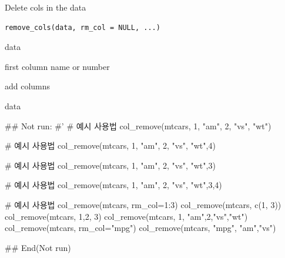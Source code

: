 \documentclass[a4paper]{book}
\begin{document}
%
\begin{Description}
Delete cols in the data
\end{Description}
%
\begin{Usage}
\begin{verbatim}
remove_cols(data, rm_col = NULL, ...)
\end{verbatim}
\end{Usage}
%
\begin{Arguments}
\begin{ldescription}
\item[\code{data}] data

\item[\code{rm\_col}] first column name or number

\item[\code{...}] add columns
\end{ldescription}
\end{Arguments}
%
\begin{Value}
data
\end{Value}
%
\begin{Examples}
\begin{ExampleCode}
\#\# Not run: 
#'
# 예시 사용법
col_remove(mtcars, 1, "am", 2, "vs", "wt")

# 예시 사용법
col_remove(mtcars, 1, "am", 2, "vs", "wt",4)


# 예시 사용법
col_remove(mtcars, 1, "am", 2, "vs", "wt",3)


# 예시 사용법
col_remove(mtcars, 1, "am", 2, "vs", "wt",3,4)

# 예시 사용법
col_remove(mtcars, rm_col=1:3)
col_remove(mtcars, c(1, 3))
col_remove(mtcars, 1,2, 3)
col_remove(mtcars, 1, "am",2,"vs","wt")
col_remove(mtcars, rm_col="mpg")
col_remove(mtcars, "mpg", "am","vs")


## End(Not run)


\end{ExampleCode}
\end{Examples}
\end{document}
